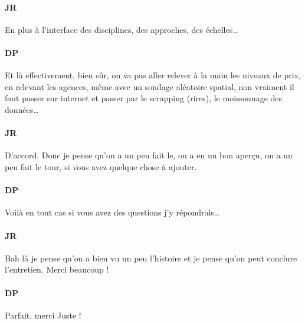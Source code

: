 \documentclass[12pt]{article}
\begin{document}
\paragraph{JR}

En plus à l'interface des disciplines, des approches, des échelles\ldots

\paragraph{DP}

Et là effectivement, bien sûr, on va pas aller relever à la main les niveaux de prix, en relevant les agences, même avec un sondage aléatoire spatial, non vraiment il faut passer sur internet et passer par le scrapping (rires), le moissonnage des données\ldots 

\paragraph{JR} 

D'accord. Donc je pense qu'on a un peu fait le, on a eu un bon aperçu, on a un peu fait le tour, si vous avez quelque chose à ajouter. 

\paragraph{DP}

Voilà en tout cas si vous avez des questions j'y répondrais\ldots

\paragraph{JR}

Bah là je pense qu'on a bien vu un peu l'histoire et je pense qu'on peut conclure l'entretien. Merci beaucoup !

\paragraph{DP}

Parfait, merci Juste !
\end{document}
